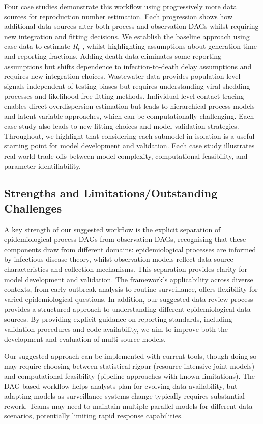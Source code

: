 \documentclass{article}
\begin{document}
\begin{enumerate}
Four case studies demonstrate this workflow using progressively more data sources for reproduction number estimation.
Each progression shows how additional data sources alter both process and observation DAGs whilst requiring new integration and fitting decisions.
We establish the baseline approach using case data to estimate $R_t$ , whilst highlighting assumptions about generation time and reporting fractions.
Adding death data eliminates some reporting assumptions but shifts dependence to infection-to-death delay assumptions and requires new integration choices.
Wastewater data provides population-level signals independent of testing biases but requires understanding viral shedding processes and likelihood-free fitting methods.
Individual-level contact tracing enables direct overdispersion estimation but leads to hierarchical process models and latent variable approaches, which can be computationally challenging.
Each case study also leads to new fitting choices and model validation strategies.
Throughout, we highlight that considering each submodel in isolation is a useful starting point for model development and validation.
Each case study illustrates real-world trade-offs between model complexity, computational feasibility, and parameter identifiability.

\subsection{Strengths and Limitations/Outstanding Challenges}

A key strength of our suggested workflow is the explicit separation of epidemiological process DAGs from observation DAGs, recognising that these components draw from different domains: epidemiological processes are informed by infectious disease theory, whilst observation models reflect data source characteristics and collection mechanisms.
This separation provides clarity for model development and validation.
The framework's applicability across diverse contexts, from early outbreak analysis to routine surveillance, offers flexibility for varied epidemiological questions.
In addition, our suggested data review process provides a structured approach to understanding different epidemiological data sources.
By providing explicit guidance on reporting standards, including validation procedures and code availability, we aim to improve both the development and evaluation of multi-source models.

Our suggested approach can be implemented with current tools, though doing so may require choosing between statistical rigour (resource-intensive joint models) and computational feasibility (pipeline approaches with known limitations).
The DAG-based workflow helps analysts plan for evolving data availability, but adapting models as surveillance systems change typically requires substantial rework.
Teams may need to maintain multiple parallel models for different data scenarios, potentially limiting rapid response capabilities.


\end{enumerate}
\end{document}
